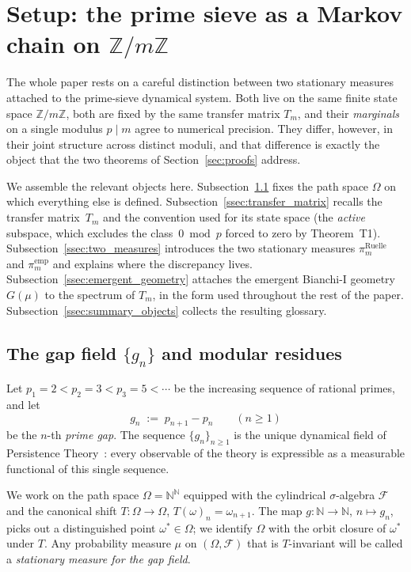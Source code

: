 \section{Setup: the prime sieve as a Markov chain on $\mathbb{Z}/m\mathbb{Z}$}
\label{sec:setup}

The whole paper rests on a careful distinction between two stationary
measures attached to the prime-sieve dynamical system. Both live on the
same finite state space $\mathbb{Z}/m\mathbb{Z}$, both are fixed by the
same transfer matrix $T_m$, and their \emph{marginals} on a single
modulus $p \mid m$ agree to numerical precision. They differ, however,
in their joint structure across distinct moduli, and that difference is
exactly the object that the two theorems of
Section~\ref{sec:proofs} address.

We assemble the relevant objects here. Subsection~\ref{ssec:gap_field}
fixes the path space $\Omega$ on which everything else is defined.
Subsection~\ref{ssec:transfer_matrix} recalls the transfer matrix~$T_m$
and the convention used for its state space (the \emph{active}
subspace, which excludes the class~$0 \bmod p$ forced to zero
by Theorem~T1).
Subsection~\ref{ssec:two_measures} introduces the two stationary
measures $\pi_m^{\mathrm{Ruelle}}$ and $\pi_m^{\mathrm{emp}}$ and
explains where the discrepancy lives.
Subsection~\ref{ssec:emergent_geometry} attaches the emergent
Bianchi-I geometry $G(\mu)$ to the spectrum of $T_m$, in the form used
throughout the rest of the paper.
Subsection~\ref{ssec:summary_objects} collects the resulting glossary.

\subsection{The gap field $\{g_n\}$ and modular residues}
\label{ssec:gap_field}

Let $p_1 = 2 < p_2 = 3 < p_3 = 5 < \cdots$ be the increasing sequence
of rational primes, and let
\begin{equation}
  g_n \;:=\; p_{n+1} - p_n \qquad (n \geq 1)
  \label{eq:gap_def}
\end{equation}
be the $n$-th \emph{prime gap}. The sequence $\{g_n\}_{n \geq 1}$ is the
unique dynamical field of Persistence
Theory~\cite{PT_MATHEMATICS_M1,PT_Monograph}: every observable of the
theory is expressible as a measurable functional of this single
sequence.

We work on the path space $\Omega = \mathbb{N}^{\mathbb{N}}$ equipped
with the cylindrical $\sigma$-algebra $\mathcal{F}$ and the canonical
shift $T : \Omega \to \Omega$, $T(\omega)_n = \omega_{n+1}$.
The map $g : \mathbb{N} \to \mathbb{N}$, $n \mapsto g_n$, picks out a
distinguished point $\omega^\ast \in \Omega$; we identify $\Omega$ with
the orbit closure of $\omega^\ast$ under $T$. Any probability measure
$\mu$ on $(\Omega, \mathcal{F})$ that is $T$-invariant will be called a
\emph{stationary measure for the gap field}.

